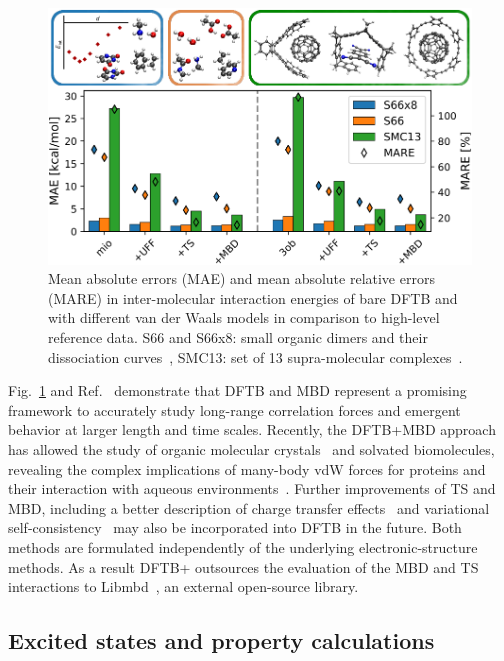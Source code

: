 \documentclass[reprint,onecolumn,superscriptaddress]{revtex4-1}
\newcommand{\dftbp}{DFTB+}
\begin{document}
\begin{figure}[htbp]
  \centering
  \includegraphics[scale=1.]{figures/DFTBvdW_benchmark_MAEs.pdf}
  \caption{\label{fig:dftbvdw_benchmarks} Mean absolute errors (MAE) and mean
    absolute relative errors (MARE) in inter-molecular interaction energies of
    bare DFTB and with different van der Waals models in comparison to
    high-level reference data. S66 and S66x8: small organic dimers and their
    dissociation curves~\cite{Rezac2011_S66,Rezac2011_S66x8}, SMC13: set of 13
    supra-molecular
    complexes~\cite{Ambrosetti2014_JPCL,Hermann2017,Stoehr2019_CSR}.}
\end{figure}
%
Fig.~\ref{fig:dftbvdw_benchmarks} and Ref.~\cite{Stoehr2016} demonstrate
that DFTB and MBD represent a promising framework to accurately study long-range
correlation forces and emergent behavior at larger length and time
scales. Recently, the DFTB+MBD approach has allowed the study of organic
molecular crystals~\cite{mortazavi2018} and solvated biomolecules, revealing the
complex implications of many-body vdW forces for proteins and their interaction
with aqueous environments~\cite{Stoehr2019}. Further improvements of TS and MBD,
including a better description of charge transfer effects~\cite{Gould2016} and
variational self-consistency~\cite{Ferri2015} may also be incorporated into DFTB
in the future.  Both methods are formulated independently of the underlying
electronic-structure methods. As a result \dftbp{} outsources the evaluation of
the MBD and TS interactions to Libmbd~\cite{libmbd}, an external open-source
library.


\subsection{Excited states and property calculations}
\end{document}
